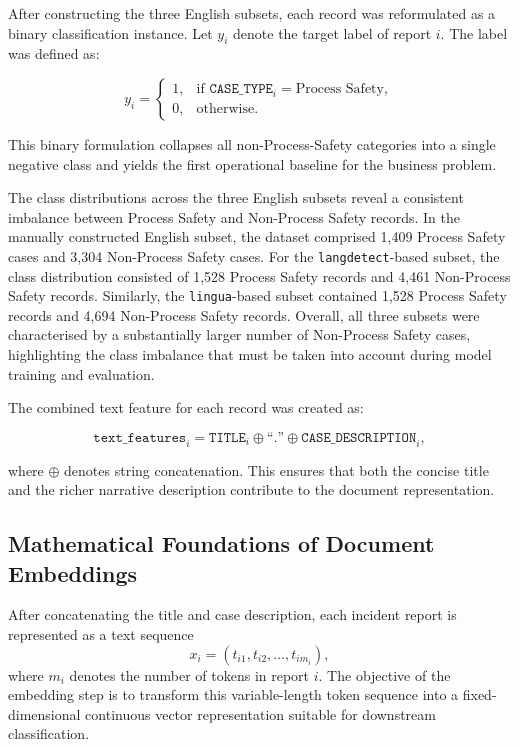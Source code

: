 \documentclass[11pt, titlepage, bibliography=totoc]{scrreprt}
\begin{document}
After constructing the three English subsets, each record was reformulated as a binary classification instance. Let $y_i$ denote the target label of report $i$. The label was defined as:

\begin{equation}
y_i =
\begin{cases}
1, & \text{if } \texttt{CASE\_TYPE}_i = \text{Process Safety},\\[0.5em]
0, & \text{otherwise}.
\end{cases}
\end{equation}

This binary formulation collapses all non-Process-Safety categories into a single negative class and yields the first operational baseline for the business problem.

The class distributions across the three English subsets reveal a consistent imbalance between Process Safety and Non-Process Safety records. In the manually constructed English subset, the dataset comprised 1,409 Process Safety cases and 3,304 Non-Process Safety cases. For the \texttt{langdetect}-based subset, the class distribution consisted of 1,528 Process Safety records and 4,461 Non-Process Safety records. Similarly, the \texttt{lingua}-based subset contained 1,528 Process Safety records and 4,694 Non-Process Safety records. Overall, all three subsets were characterised by a substantially larger number of Non-Process Safety cases, highlighting the class imbalance that must be taken into account during model training and evaluation.

The combined text feature for each record was created as:

\begin{equation}
\texttt{text\_features}_i = \texttt{TITLE}_i \oplus \text{``.''} \oplus \texttt{CASE\_DESCRIPTION}_i,
\end{equation}

where $\oplus$ denotes string concatenation. This ensures that both the concise title and the richer narrative description contribute to the document representation.

\subsection{Mathematical Foundations of Document Embeddings}
After concatenating the title and case description, each incident report is represented as a text sequence
\begin{equation}
x_i = (t_{i1}, t_{i2}, \dots, t_{im_i}),
\end{equation}
where $m_i$ denotes the number of tokens in report $i$. The objective of the embedding step is to transform this variable-length token sequence into a fixed-dimensional continuous vector representation suitable for downstream classification.
\end{document}
